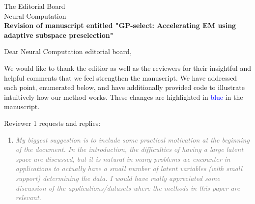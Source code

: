 \documentclass[10pt]{letter}
\newcommand{\rvr}[1]{\textcolor{gray}{#1}}
\begin{document}
\begin{letter}{
The Editorial Board\\
Neural Computation\\
\vspace{10mm}
\textbf{Revision of manuscript entitled "GP-select: Accelerating EM using adaptive
subspace preselection"}
}

%
%
%
%
%
%
% 

\opening{Dear Neural Computation editorial board,}

We would like to thank the editior as well as the reviewers for their insightful and helpful comments that we feel strengthen the manuscript.  We have addressed each point, enumerated below, and have additionally provided code to illustrate intuitively how our method works. These changes are highlighted in \textcolor{blue}{blue} in the manuscript.


Reviewer 1 requests and replies:

\begin{enumerate}[topsep=3pt,itemsep=2ex,partopsep=1ex,parsep=1ex]
    \item \rvr{\emph{My biggest suggestion is to include some practical motivation at the beginning of the document. In the introduction, the difficulties of having a large latent space are discussed, but it is natural in many problems we encounter in applications to actually have a small number of latent variables (with small support) determining the data. I would have really appreciated some discussion of the applications/datasets where the methods in this paper are relevant.}}


\end{enumerate}
\end{letter}
\end{document}
